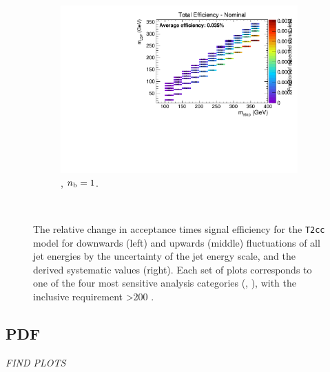 \begin{figure}[ht!]
\begin{subfigure}[b]{0.32\textwidth}
    \includegraphics[width=\textwidth, page=6]{Figs/sms/t2cc/v24/JES_T2cc_v24_eq1b_ge4j_incl.pdf}
    \caption{\njhigh, $n_{\text{b}} = 1$.}
    \label{fig:sms-jes-t2cc-ge4j-1b}
  \end{subfigure}\\
  \caption{The relative change in acceptance times signal efficiency for the
  \texttt{T2cc} model for downwards (left) and upwards (middle) fluctuations
  of all jet energies by the uncertainty of the jet energy scale, and the 
  derived systematic values (right). Each set of plots corresponds to one of
  the four most sensitive analysis categories (\nb, \nj), with the inclusive 
  requirement \HT>200 \gev.}
  \label{fig:sms-jes-t2cc}
\end{figure}


\newpage
\subsection*{PDF}
\label{sec:t2cc_pdf_plots}
\emph{FIND PLOTS}




